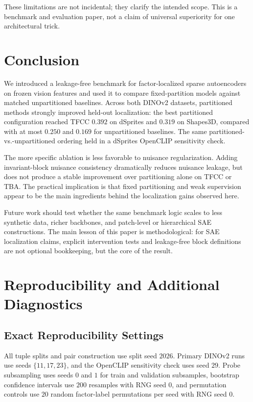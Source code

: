 \documentclass[10pt,twocolumn]{article}
\newcommand{\tfcc}{\textsc{TFCC}}
\newcommand{\tba}{\textsc{TBA}}
\begin{document}
These limitations are not incidental; they clarify the intended scope. This is a benchmark and evaluation paper, not a claim of universal superiority for one architectural trick.

\section{Conclusion}
\label{sec:conclusion}
We introduced a leakage-free benchmark for factor-localized sparse autoencoders on frozen vision features and used it to compare fixed-partition models against matched unpartitioned baselines. Across both DINOv2 datasets, partitioned methods strongly improved held-out localization: the best partitioned configuration reached \tfcc{} $0.392$ on dSprites and $0.319$ on Shapes3D, compared with at most $0.250$ and $0.169$ for unpartitioned baselines. The same partitioned-vs.-unpartitioned ordering held in a dSprites OpenCLIP sensitivity check.

The more specific ablation is less favorable to nuisance regularization. Adding invariant-block nuisance consistency dramatically reduces nuisance leakage, but does not produce a stable improvement over partitioning alone on \tfcc{} or \tba{}. The practical implication is that fixed partitioning and weak supervision appear to be the main ingredients behind the localization gains observed here.

Future work should test whether the same benchmark logic scales to less synthetic data, richer backbones, and patch-level or hierarchical SAE constructions. The main lesson of this paper is methodological: for SAE localization claims, explicit intervention tests and leakage-free block definitions are not optional bookkeeping, but the core of the result.

\appendix
\section{Reproducibility and Additional Diagnostics}

\subsection{Exact Reproducibility Settings}
All tuple splits and pair construction use split seed $2026$. Primary DINOv2 runs use seeds $\{11,17,23\}$, and the OpenCLIP sensitivity check uses seed $29$. Probe subsampling uses seeds $0$ and $1$ for train and validation subsamples, bootstrap confidence intervals use $200$ resamples with RNG seed $0$, and permutation controls use $20$ random factor-label permutations per seed with RNG seed $0$.
\end{document}
